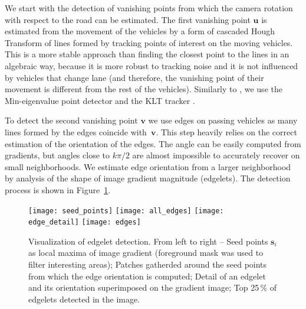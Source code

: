 \documentclass[]{elsarticle}
\begin{document}
We start with the detection of vanishing points from which the camera rotation with respect to the road can be estimated. The first vanishing point $\mathbf{u}$ is estimated from the movement of the vehicles by a form of cascaded Hough Transform \citep{Dubska2015ITS} of lines formed by tracking points of interest on the moving vehicles. This is a more stable approach than finding the closest point to the lines in an algebraic way, because it is more robust to tracking noise and it is not influenced by vehicles that change lane (and therefore, the vanishing point of their movement is different from the rest of the vehicles).  Similarly to \cite{Dubska2015ITS}, we use the Min-eigenvalue point detector \citep{Shi1994} and the KLT tracker \citep{Tomasi1991}.


To detect the second vanishing point $\mathbf{v}$ we use edges on passing vehicles as many lines formed by the edges coincide with~$\mathbf{v}$.
This step heavily relies on the correct estimation of the orientation of the edges. The angle can be easily computed from gradients, but angles close to $k \pi/2$ are almost impossible to accurately recover on small neighborhoods. We estimate edge orientation from a larger neighborhood by analysis of the shape of image gradient magnitude (edgelets). The detection process is shown in Figure~\ref{fig:Edgelets}.

\begin{figure}[t]
    \centering
    \texttt{[image: seed\_points]}
    \texttt{[image: all\_edges]}
    \texttt{[image: edge\_detail]}
    \texttt{[image: edges]}
    \caption{
        Visualization of edgelet detection. From left to right -- Seed points $\mathbf{s}_i$ as local maxima of image gradient (foreground mask was used to filter interesting areas); Patches gatherded around the seed points from which the edge orientation is computed; Detail of an edgelet and its orientation superimposed on the gradient image; Top 25\,\% of edgelets detected in the image.
    }
    \label{fig:Edgelets}
\end{figure}
\end{document}
